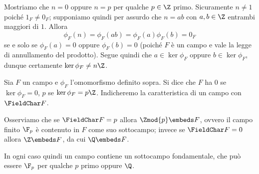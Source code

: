 Mostriamo che $n = 0$ oppure $n = p$ per qualche $p \in \Z$ primo. Sicuramente $n \neq 1$ poiché $1_F \neq 0_F$; supponiamo quindi per assurdo che $n = ab$ con $a, b \in \Z$ entrambi maggiori di $1$. Allora \[
    \phi_F(n) = \phi_F(ab) = \phi_F(a)\phi_F(b) = 0_F
\] se e solo se $\phi_F(a) = 0$ oppure $\phi_F(b) = 0$ (poiché $F$ è un campo e vale la legge di annullamento del prodotto).
Segue quindi che $a \in \ker \phi_F$ oppure $b \in \ker \phi_F$, dunque certamente $\ker \phi_F \neq n\Z$.

\begin{definition}
    Sia $F$ un campo e $\phi_F$ l'omomorfismo definito sopra.
    Si dice che $F$ ha  $0$ se $\ker \phi_F = 0$,  $p$ se $\ker \phi_F = p\Z$.
    Indicheremo la caratteristica di un campo con $\FieldChar F$.
\end{definition}

Osserviamo che se $\FieldChar F = p$ allora $\Zmod{p} \embeds F$, ovvero il campo finito $\F_{p}$ è contenuto in $F$ come suo sottocampo; invece se $\FieldChar F = 0$ allora $\Z \embeds F$, da cui $\Q \embeds F$.

In ogni caso quindi un campo contiene un sottocampo fondamentale, che può essere $\F_p$ per qualche $p$ primo oppure $\Q$.